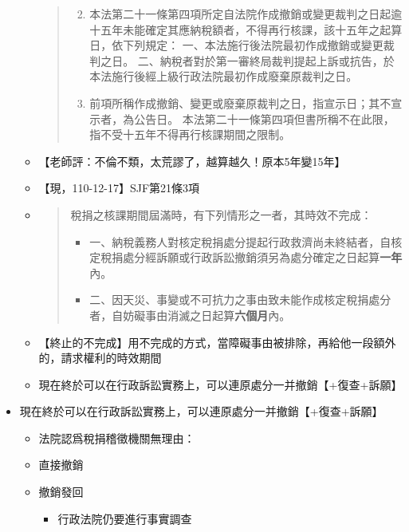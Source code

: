 \documentclass[]{ctexbook}
\providecommand{\tightlist}{%
  \setlength{\itemsep}{0pt}\setlength{\parskip}{0pt}}
\begin{document}
\begin{itemize}
\begin{itemize}
\begin{quote}
    \begin{enumerate}
    \def\labelenumi{\arabic{enumi}.}
    \tightlist
    \item
      本法第二十一條第四項所定自法院作成撤銷或變更裁判之日起逾十五年未能確定其應納稅額者，不得再行核課，該十五年之起算日，依下列規定：
      一、本法施行後法院最初作成撤銷或變更裁判之日。
      二、納稅者對於第一審終局裁判提起上訴或抗告，於本法施行後經上級行政法院最初作成廢棄原裁判之日。
    \item
      前項所稱作成撤銷、變更或廢棄原裁判之日，指宣示日；其不宣示者，為公告日。
      本法第二十一條第四項但書所稱不在此限，指不受十五年不得再行核課期間之限制。
    \end{enumerate}
    \end{quote}
  \item
    【老師評：不倫不類，太荒謬了，越算越久！原本5年變15年】
  \item
    【現，110-12-17】SJF第21條3項
  \item
    \begin{quote}
    稅捐之核課期間屆滿時，有下列情形之一者，其時效不完成：

    \begin{itemize}
    \tightlist
    \item
      一、納稅義務人對核定稅捐處分提起行政救濟尚未終結者，自核定稅捐處分經訴願或行政訴訟撤銷須另為處分確定之日起算\textbf{一年}內。
    \item
      二、因天災、事變或不可抗力之事由致未能作成核定稅捐處分者，自妨礙事由消滅之日起算\textbf{六個月}內。
    \end{itemize}
    \end{quote}
  \item
    【終止的不完成】用不完成的方式，當障礙事由被排除，再給他一段額外的，請求權利的時效期間
  \item
    現在終於可以在行政訴訟實務上，可以連原處分一并撤銷【+復查+訴願】
  \end{itemize}
\item
  現在終於可以在行政訴訟實務上，可以連原處分一并撤銷【+復查+訴願】

  \begin{itemize}
  \tightlist
  \item
    法院認爲稅捐稽徵機關無理由：
  \item
    直接撤銷
  \item
    撤銷發回

    \begin{itemize}
    \tightlist
    \item
      行政法院仍要進行事實調查


\end{itemize}
\end{itemize}
\end{itemize}
\end{document}
